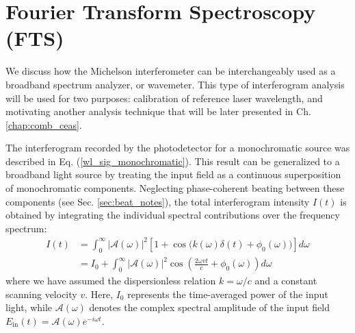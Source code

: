 \documentclass[8pt,a4paper]{report}
\begin{document}
	
	\section{Fourier Transform Spectroscopy (FTS)} \label{sec:wl_FTIR}

	We discuss how the Michelson interferometer can be interchangeably used as a broadband spectrum analyzer, or wavemeter. This type of interferogram analysis will be used for two purposes: calibration of reference laser wavelength, and motivating another analysis technique that will be later presented in Ch. \ref{chap:comb_ceas}.
	
	The interferogram recorded by the photodetector for a monochromatic source was described in Eq. (\ref{wl_sig_monochromatic}). This result can be generalized to a broadband light source by treating the input field as a continuous superposition of monochromatic components. Neglecting phase-coherent beating between these components (see Sec. \ref{sec:beat_notes}), the total interferogram intensity $I(t)$ is obtained by integrating the individual spectral contributions over the frequency spectrum:
	\begin{align} \label{wl_interferogram_incoherent}
		I(t) &= \int_{0}^{\infty} |\mathcal{A}(\omega)|^2 \left[ 1 + \cos\big(k(\omega)\delta(t) + \phi_0(\omega)\big) \right] d\omega \nonumber \\
		&= I_0 + \int_{0}^{\infty} |\mathcal{A}(\omega)|^2 \cos\left(\frac{2\omega vt}{c} + \phi_0(\omega)\right) d\omega
	\end{align}
	where we have assumed the dispersionless relation $k = \omega/c$ and a constant scanning velocity $v$. Here, $I_0$ represents the time-averaged power of the input light, while $\mathcal{A}(\omega)$ denotes the complex spectral amplitude of the input field $E_\mathrm{in}(t) = \mathcal{A}(\omega) e^{-i\omega t}$.
	
\end{document}
